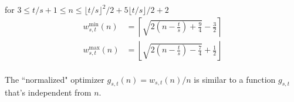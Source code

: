 \documentclass[]{article}
\begin{document}
\vspace{1cm}
\begin{lemma} for $3\leq t/s +1 \leq n \leq \lfloor t/s\rfloor^2/2+5\lfloor t/s\rfloor / 2 +2$
	\begin{align*}
		w^{\min}_{s,t}(n) &= \left\lceil \sqrt{2\left(n-\frac{t}{s}\right)+\frac{9}{4}}-\frac{3}{2} \right\rceil\\
		w^{\max}_{s,t}(n) &= \left\lfloor \sqrt{2\left(n-\frac{t}{s}\right)-\frac{7}{4}}+\frac{1}{2} \right\rfloor\\
	\end{align*}
\end{lemma}

\vspace{1cm}
\begin{lemma}
	The ``normalized" optimizer $g_{s,t}(n) = w_{s,t}(n)/n$ is similar to a function $g_{s,t}$ that's independent from $n$.
\end{lemma}
\end{document}

